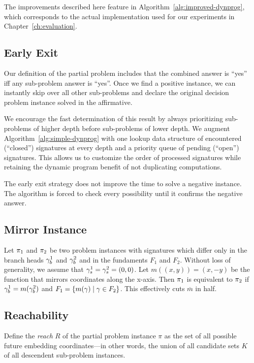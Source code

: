 The improvements described here feature in Algorithm~\ref{alg:improved-dynprog}, which corresponds to the actual implementation used for our experiments in Chapter~\ref{ch:evaluation}.

\subsection{Early Exit}
\label{section:ch3_earlyexit}

Our definition of the partial problem includes that the combined answer is ``yes'' iff any sub-problem answer is ``yes''. Once we find a positive instance, we can instantly skip over all other sub-problems and declare the original decision problem instance solved in the affirmative.

We encourage the fast determination of this result by always prioritizing sub-problems of higher depth before sub-problems of lower depth. We augment Algorithm~\ref{alg:simple-dynprog} with one lookup data structure of encountered (``closed'') signatures at every depth and a priority queue of pending (``open'') signatures. This allows us to customize the order of processed signatures while retaining the dynamic program benefit of not duplicating computations.

The early exit strategy does not improve the time to solve a negative instance. The algorithm is forced to check every possibility until it confirms the negative answer.

\subsection{Mirror Instance}

Let $\pi_1$ and $\pi_2$ be two problem instances with signatures which differ only in the branch heads $\gamma_b^1$ and $\gamma_b^2$ and in the fundaments $F_1$ and $F_2$. Without loss of generality, we assume that $\gamma_s^1 = \gamma_s^2 = (0, 0)$.
Let $m((x, y)) = (x, -y)$ be the function that mirrors coordinates along the x-axis.
Then $\pi_1$ is equivalent to $\pi_2$ if $\gamma_b^1 = m(\gamma_b^2)$ and $F_1 = \{m(\gamma) \mid \gamma \in F_2\}$.
This effectively cuts $\overline{m}$ in half.

\subsection{Reachability}

Define the \emph{reach} $R$ of the partial problem instance $\pi$ as the set of all possible future embedding coordinates---in other words, the union of all candidate sets $K$ of all descendent sub-problem instances.

